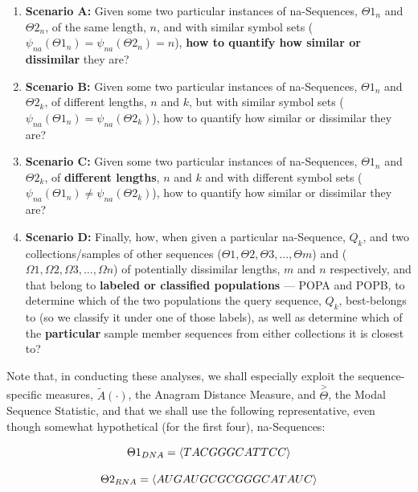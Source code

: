 \documentclass[a4paper, 18pt]{book} %
\begin{document}
\begin{enumerate}
\item \textbf{Scenario A:} Given some two particular instances of na-Sequences, $\Theta1_n$ and $\Theta2_n$, of the same length, $n$, and with similar symbol sets ($\psi_{na}(\Theta1_n) = \psi_{na}(\Theta2_n) = n$), \textbf{how to quantify how similar or dissimilar} they are?
\item \textbf{Scenario B:} Given some two particular instances of na-Sequences, $\Theta1_n$ and $\Theta2_k$, of different lengths, $n$ and $k$, but with similar symbol sets ($\psi_{na}(\Theta1_n) = \psi_{na}(\Theta2_k)$), how to quantify how similar or dissimilar they are?
\item \textbf{Scenario C:} Given some two particular instances of na-Sequences, $\Theta1_n$ and $\Theta2_k$, of \textbf{different lengths}, $n$ and $k$ and with different symbol sets ($\psi_{na}(\Theta1_n) \neq \psi_{na}(\Theta2_k)$), how to quantify how similar or dissimilar they are?
\item \textbf{Scenario D:} Finally, how, when given a particular na-Sequence, $Q_k$, and two collections/samples of other sequences ($\Theta1, \Theta2, \Theta3,..., \Theta m$) and ($\Omega1, \Omega2, \Omega3,..., \Omega n$) of potentially dissimilar lengths, $m$ and $n$ respectively, and that belong to \textbf{labeled or classified populations} --- POPA and POPB, to determine which of the two populations the query sequence, $Q_k$, best-belongs to (so we classify it under one of those labels), as well as determine which of the \textbf{particular} sample member sequences from either collections it is closest to?
\end{enumerate}

Note that, in conducting these analyses, we shall especially exploit the sequence-specific measures, $\tilde{A}(\cdot)$, the Anagram Distance Measure\cite{adtpaper}\cite{transformatics}, and $\overset{>}{\Theta}$, the Modal Sequence Statistic\cite{transformatics}, and that we shall use the following representative, even though somewhat hypothetical (for the first four), na-Sequences:

\begin{equation}
{\Theta1}_{DNA} = \langle TAC GGG CAT TCC \rangle\\
\end{equation}

\begin{equation}
{\Theta2}_{RNA} = \langle AUG AUG CGC GGG CAT AUC \rangle\\
\end{equation}
\end{document}
